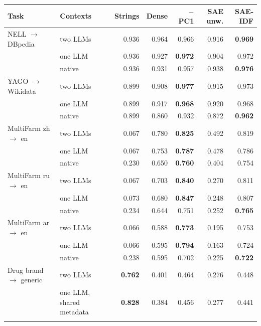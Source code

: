 \begin{tabular}{@{}llrrrrr@{}}
\toprule
Task & Contexts & Strings & Dense & $-$PC1 & SAE unw. & \textbf{SAE-IDF} \\
\midrule
NELL $\to$ DBpedia & two LLMs & 0.936 & 0.964 & 0.966 & 0.916 & \textbf{0.969} \\
 & one LLM & 0.936 & 0.927 & \textbf{0.972} & 0.904 & 0.972 \\
 & native & 0.936 & 0.931 & 0.957 & 0.938 & \textbf{0.976} \\
\addlinespace[2pt]
YAGO $\to$ Wikidata & two LLMs & 0.899 & 0.908 & \textbf{0.977} & 0.915 & 0.973 \\
 & one LLM & 0.899 & 0.917 & \textbf{0.968} & 0.920 & 0.968 \\
 & native & 0.899 & 0.860 & 0.932 & 0.872 & \textbf{0.962} \\
\addlinespace[2pt]
MultiFarm zh $\to$ en & two LLMs & 0.067 & 0.780 & \textbf{0.825} & 0.492 & 0.819 \\
 & one LLM & 0.067 & 0.753 & \textbf{0.787} & 0.478 & 0.786 \\
 & native & 0.230 & 0.650 & \textbf{0.760} & 0.404 & 0.754 \\
\addlinespace[2pt]
MultiFarm ru $\to$ en & two LLMs & 0.067 & 0.703 & \textbf{0.840} & 0.270 & 0.811 \\
 & one LLM & 0.073 & 0.680 & \textbf{0.847} & 0.248 & 0.807 \\
 & native & 0.234 & 0.644 & 0.751 & 0.252 & \textbf{0.765} \\
\addlinespace[2pt]
MultiFarm ar $\to$ en & two LLMs & 0.066 & 0.588 & \textbf{0.773} & 0.195 & 0.753 \\
 & one LLM & 0.066 & 0.595 & \textbf{0.794} & 0.163 & 0.724 \\
 & native & 0.238 & 0.595 & 0.702 & 0.225 & \textbf{0.722} \\
\addlinespace[2pt]
Drug brand $\to$ generic & two LLMs & \textbf{0.762} & 0.401 & 0.464 & 0.276 & 0.448 \\
 & one LLM, shared metadata & \textbf{0.828} & 0.384 & 0.456 & 0.277 & 0.441 \\
\addlinespace[2pt]
\bottomrule
\end{tabular}
